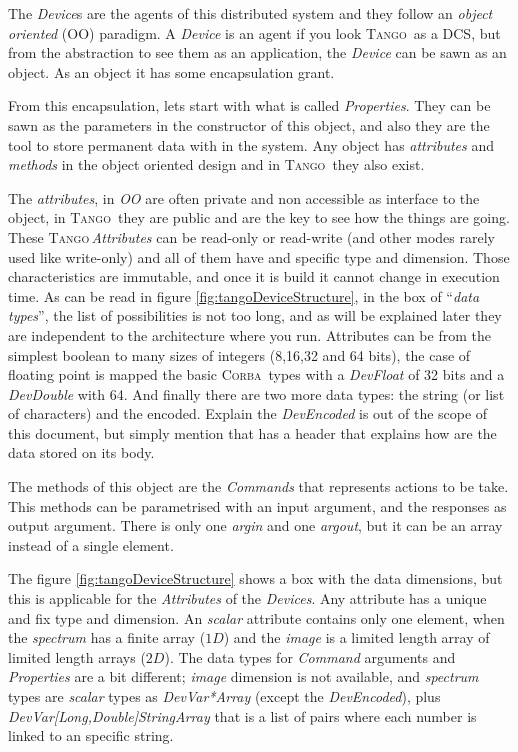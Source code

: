 \documentclass[10pt,a4paper,twoside]{llncs}
\newcommand{\tango}{\textsc{Tango}}
\newcommand{\corba}{\textsc{Corba}}
\begin{document}
The \emph{Device}s are the agents of this distributed system and they follow an \emph{object oriented} (OO) paradigm. A \emph{Device} is an agent if you look \tango\, as a DCS, but from the abstraction to see them as an application, the \emph{Device} can be sawn as an object. As an object it has some encapsulation grant.

From this encapsulation, lets start with what is called \emph{Properties}. They can be sawn as the parameters in the constructor of this object, and also they are the tool to store permanent data with in the system. Any object has \emph{attributes} and \emph{methods} in the object oriented design and in \tango\, they also exist.

The \emph{attributes}, in \emph{OO} are often private and non accessible as interface to the object, in \tango\, they are public and are the key to see how the things are going. These \tango\,\emph{Attributes} can be read-only or read-write (and other modes rarely used like write-only) and all of them have and specific type and dimension. Those characteristics are immutable, and once it is build it cannot change in execution time. As can be read in figure \ref{fig:tangoDeviceStructure}, in the box of ``\emph{data types}'', the list of possibilities is not too long, and as will be explained later they are independent to the architecture where you run. Attributes can be from the simplest boolean to many sizes of integers (8,16,32 and 64 bits), the case of floating point is mapped the basic \corba\, types with a \emph{DevFloat} of 32 bits and a \emph{DevDouble} with 64. And finally there are two more data types: the string (or list of characters) and the encoded. Explain the \emph{DevEncoded} is out of 
the scope of this document, but simply mention that has a header that explains how are the data stored on its body.

The methods of this object are the \emph{Commands} that represents actions to be take. This methods can be parametrised with an input argument, and the responses as output argument. There is only one \emph{argin} and one \emph{argout}, but it can be an array instead of a single element.

The figure \ref{fig:tangoDeviceStructure} shows a box with the data dimensions, but this is applicable for the \emph{Attributes} of the \emph{Devices}. Any attribute has a unique and fix type and dimension. An \emph{scalar} attribute contains only one element, when the \emph{spectrum} has a finite array ($1D$) and the \emph{image} is a limited length array of limited length arrays ($2D$). The data types for \emph{Command} arguments and \emph{Properties} are a bit different; \emph{image} dimension is not available, and \emph{spectrum} types are \emph{scalar} types as \emph{DevVar*Array} (except the \emph{DevEncoded}), plus \emph{DevVar[Long,Double]StringArray} that is a list of pairs where each number is linked to an specific string.
\end{document}
